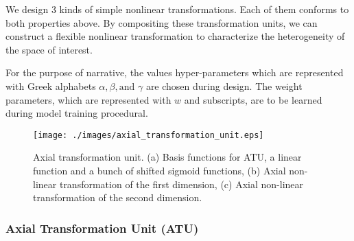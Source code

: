 \documentclass[journal, oneside, twocolumn]{IEEEtran}
\begin{document}
We design 3 kinds of simple nonlinear transformations. Each of them conforms to both properties above. By compositing these transformation units, we can construct a flexible nonlinear transformation to characterize the heterogeneity of the space of interest. 

For the purpose of narrative, the values hyper-parameters which are represented with Greek alphabets $\alpha, \beta, \text{and } \gamma$ are chosen during design. The weight parameters, which are represented with $w$ and subscripts, are to be learned during model training procedural.

\begin{figure}[!tb]
  \centering
  \texttt{[image: ./images/axial\_transformation\_unit.eps]}
  \caption{Axial transformation unit. (a) Basis functions for ATU, a linear function and a bunch of shifted sigmoid functions, (b) Axial non-linear transformation of the first dimension, (c) Axial non-linear transformation of the second dimension.}
  \label{fig:axial_trans_unit}
\end{figure}


\subsubsection{Axial Transformation Unit (ATU)}
\end{document}
